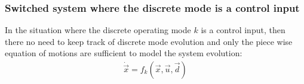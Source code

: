 \subsubsection{Switched system where the discrete mode is a control input}

In the situation where the discrete operating mode $k$ is a control input, then there no need to keep track of discrete mode evolution and only the piece wise equation of motions are sufficient to model the system evolution:
%
\begin{align}
\dot{\vec{x}} = f_k( \vec{x} , \vec{u} , \vec{d} ) 
\end{align}



